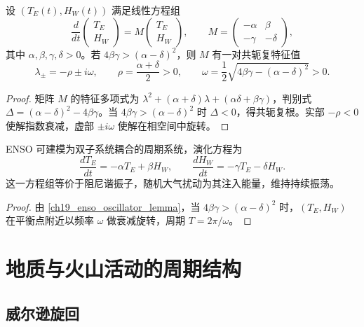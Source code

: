 \begin{lemma}\label{ch19_enso_oscillator_lemma}
设 $(T_E(t),H_W(t))$ 满足线性方程组
\[
\frac{d}{dt}\begin{pmatrix}T_E\\H_W\end{pmatrix}
= M\begin{pmatrix}T_E\\H_W\end{pmatrix},\qquad
M=\begin{pmatrix}-\alpha & \beta\\ -\gamma & -\delta\end{pmatrix},
\]
其中 $\alpha,\beta,\gamma,\delta>0$。若 $4\beta\gamma>(\alpha-\delta)^2$，则 $M$ 有一对共轭复特征值
\[
\lambda_{\pm}=-\rho\pm i\omega,\qquad
\rho=\frac{\alpha+\delta}{2}>0,\qquad
\omega=\frac{1}{2}\sqrt{4\beta\gamma-(\alpha-\delta)^2}>0.
\]
\end{lemma}

\begin{proof}
矩阵 $M$ 的特征多项式为 $\lambda^2+(\alpha+\delta)\lambda+(\alpha\delta+\beta\gamma)$，判别式 $\Delta=(\alpha-\delta)^2-4\beta\gamma$。当 $4\beta\gamma>(\alpha-\delta)^2$ 时 $\Delta<0$，得共轭复根。实部 $-\rho<0$ 使解指数衰减，虚部 $\pm i\omega$ 使解在相空间中旋转。
\end{proof}

\begin{proposition}\label{prop:enso_periodic_system}
ENSO 可建模为双子系统耦合的周期系统，演化方程为
\[
\frac{dT_E}{dt}=-\alpha T_E+\beta H_W,\qquad
\frac{dH_W}{dt}=-\gamma T_E-\delta H_W.
\]
这一方程组等价于阻尼谐振子，随机大气扰动为其注入能量，维持持续振荡。
\end{proposition}

\begin{proof}
由 \cref{ch19_enso_oscillator_lemma}，当 $4\beta\gamma>(\alpha-\delta)^2$ 时，$(T_E,H_W)$ 在平衡点附近以频率 $\omega$ 做衰减旋转，周期 $T=2\pi/\omega$。
\end{proof}

\section{地质与火山活动的周期结构}
\label{sec:geological_cycles}

\subsection{威尔逊旋回}


